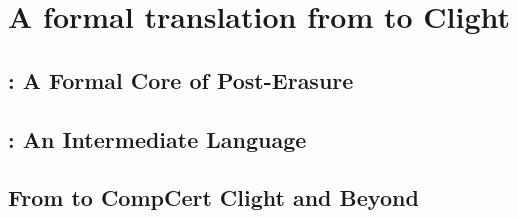 \section{A formal translation from \lowstar to Clight}
\label{sec:formal}

\newcommand\emf{{\sc emf}$^\star$\xspace}
\newcommand\emfST{{\sc emf}$^\star_{\text {\sc st}}$\xspace} %



  




\subsection{\lamstar: A Formal Core of \lowstar Post-Erasure}
\label{sec:lamstar}



\subsection{\cstar: An Intermediate Language}
\label{sec:lamstar-to-cstar}

\label{sec:low-to-c}


\subsection{From \cstar to CompCert Clight and Beyond}
\label{sec:to-clight}


